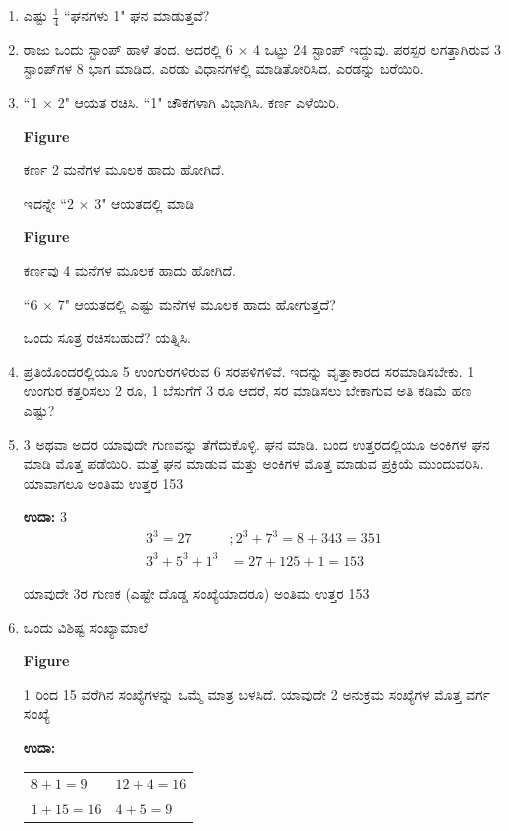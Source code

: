 \begin{enumerate}
\item ಎಷ್ಟು $\frac{1}{4}$ “ಘನಗಳು 1" ಘನ ಮಾಡುತ್ತವೆ?

\item ರಾಜು ಒಂದು ಸ್ಟಾಂಪ್ ಹಾಳೆ ತಂದ. ಅದರಲ್ಲಿ 6 $\times$ 4 ಒಟ್ಟು 24 ಸ್ಟಾಂಪ್ ಇದ್ದುವು. ಪರಸ್ಪರ ಲಗತ್ತಾಗಿರುವ 3 ಸ್ಟಾಂಪ್‌ಗಳ 8 ಭಾಗ ಮಾಡಿದ. ಎರಡು ವಿಧಾನಗಳಲ್ಲಿ ಮಾಡಿತೋರಿಸಿದ. ಎರಡನ್ನು ಬರೆಯಿರಿ.

\item “1 $\times$ 2" ಆಯತ ರಚಿಸಿ. “1" ಚೌಕಗಳಾಗಿ ವಿಭಾಗಿಸಿ. ಕರ್ಣ ಎಳೆಯಿರಿ. 
\begin{center}
{\bf Figure}

ಕರ್ಣ 2 ಮನೆಗಳ ಮೂಲಕ ಹಾದು ಹೋಗಿದೆ.
\end{center}

ಇದನ್ನೇ “2 $\times$ 3" ಆಯತದಲ್ಲಿ ಮಾಡಿ 
\begin{center}
{\bf Figure}

ಕರ್ಣವು 4 ಮನೆಗಳ ಮೂಲಕ ಹಾದು ಹೋಗಿದೆ. 
\end{center}

“6 $\times$ 7" ಆಯತದಲ್ಲಿ ಎಷ್ಟು ಮನೆಗಳ ಮೂಲಕ ಹಾದು ಹೋಗುತ್ತದೆ? 

ಒಂದು ಸೂತ್ರ ರಚಿಸಬಹುದೆ? ಯತ್ನಿಸಿ.

\item ಪ್ರತಿಯೊಂದರಲ್ಲಿಯೂ 5 ಉಂಗುರಗಳಿರುವ 6 ಸರಪಳಿಗಳಿವೆ. ಇದನ್ನು ವೃತ್ತಾಕಾರದ ಸರಮಾಡಿಸಬೇಕು. 1 ಉಂಗುರ ಕತ್ತರಿಸಲು 2 ರೂ, 1 ಬೆಸುಗೆಗೆ 3 ರೂ ಆದರೆ, ಸರ ಮಾಡಿಸಲು ಬೇಕಾಗುವ ಅತಿ ಕಡಿಮೆ ಹಣ ಎಷ್ಟು?

\item 3 ಅಥವಾ ಅದರ ಯಾವುದೇ ಗುಣವನ್ನು ತೆಗೆದುಕೊಳ್ಳಿ. ಘನ ಮಾಡಿ. ಬಂದ ಉತ್ತರದಲ್ಲಿಯೂ ಅಂಕಿಗಳ ಘನ ಮಾಡಿ ಮೊತ್ತ ಪಡೆಯಿರಿ. ಮತ್ತೆ ಘನ ಮಾಡುವ ಮತ್ತು ಅಂಕಿಗಳ ಮೊತ್ತ ಮಾಡುವ ಪ್ರಕ್ರಿಯೆ ಮುಂದುವರಿಸಿ. ಯಾವಾಗಲೂ ಅಂತಿಮ ಉತ್ತರ 153

{\bf ಉದಾ:} 3
\begin{align*}
 3^{3} = 27&; 2^{3} + 7^{3} = 8 + 343 = 351\\
3^{3} + 5^{3} + 1^{3} & = 27 + 125 + 1 = 153
\end{align*}

ಯಾವುದೇ 3ರ ಗುಣಕ (ಎಷ್ಟೇ ದೊಡ್ಡ ಸಂಖ್ಯೆಯಾದರೂ) ಅಂತಿಮ ಉತ್ತರ 153

\item ಒಂದು ವಿಶಿಷ್ಟ ಸಂಖ್ಯಾಮಾಲೆ
\begin{center}
{\bf Figure}
\end{center}

1 ರಿಂದ 15 ವರೆಗಿನ ಸಂಖ್ಯೆಗಳನ್ನು ಒಮ್ಮೆ ಮಾತ್ರ ಬಳಸಿದೆ. ಯಾವುದೇ 2 ಅನುಕ್ರಮ ಸಂಖ್ಯೆಗಳ ಮೊತ್ತ ವರ್ಗ ಸಂಖ್ಯೆ

{\bf ಉದಾ:}
\begin{tabular}[t]{ll}
$8 + 1 = 9$ & $12 + 4 = 16$\\
$1 + 15 = 16$ & $4 + 5 = 9$
\end{tabular}


\end{enumerate}
